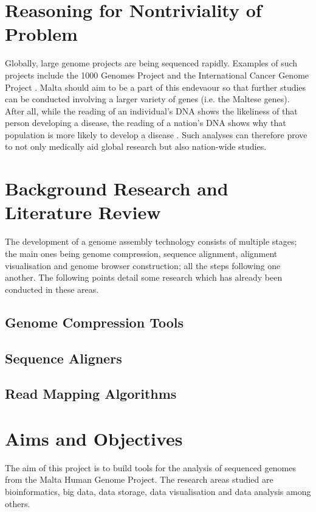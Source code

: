 \documentclass{csfyp}
\begin{document}
\section{Reasoning for Nontriviality of Problem}

Globally, large genome projects are being sequenced rapidly.  Examples of such projects include the 1000 Genomes Project and the International Cancer Genome Project \cite{bwtransform, refcompression, popgen}.  Malta should aim to be a part of this endevaour so that further studies can be conducted involving a larger variety of genes (i.e. the Maltese genes).  After all, while the reading of an individual's DNA shows the likeliness of that person developing a disease, the reading of a nation’s DNA shows why that population is more likely to develop a disease \cite{think1}.  Such analyses can therefore prove to not only medically aid global research but also nation-wide studies.             


\section{Background Research and Literature Review}

The development of a genome assembly technology consists of multiple stages; the main ones being genome compression, sequence alignment, alignment visualisation and genome browser construction; all the steps following one another.  The following points detail some research which has already been conducted in these areas.

\subsection{Genome Compression Tools}

\subsection{Sequence Aligners}

\subsection{Read Mapping Algorithms}


\section{Aims and Objectives}

The aim of this project is to build tools for the analysis of sequenced genomes from the Malta Human Genome Project.  The research areas studied are bioinformatics, big data, data storage, data visualisation and data analysis among others.
\end{document}
